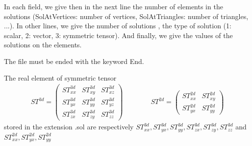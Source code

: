 \documentclass[a4paper,twoside,12pt]{book}
\begin{document}
In each field, we give then in the next line the number of elements in the solutions
(SolAtVertices: number of vertices, SolAtTriangles: number of triangles, ...). In other lines, we give
 the number of solutions , the type of solution (1: scalar, 2: vector, 3: symmetric tensor).
 And finally,  we give the values of the solutions on the elements.

The file must be ended with the keyword End.

The real element of symmetric tensor
\begin{eqnarray}
\label{savesol.def.symtensor}
ST^{3d}=\left(
\begin{array}{ccc}
ST_{xx}^{3d} & ST_{xy}^{3d} & ST_{xz}^{3d}\\
ST_{yx}^{3d} & ST_{yy}^{3d} & ST_{yz}^{3d} \\
ST_{zx}^{3d} & ST_{zy}^{3d} & ST_{zz}^{3d}
\end{array}
\right)
\qquad \qquad
ST^{2d}= \left(
\begin{array}{cc}
ST_{xx}^{2d} & ST_{xy}^{2d} \\
ST_{yx}^{2d} & ST_{yy}^{2d}
\end{array}
\right)
\end{eqnarray}
stored in the extension .sol are respectively $ST_{xx}^{3d}, ST_{yx}^{3d}, ST_{yy}^{3d}, ST_{zx}^{3d}, ST_{zy}^{3d}, ST_{zz}^{3d}$
and  $ST_{xx}^{2d}, ST_{yx}^{2d}, ST_{yy}^{2d}$
\end{document}
